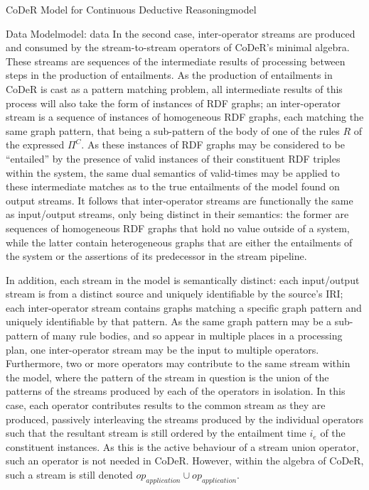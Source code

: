 \begin{nestedsection}{CoDeR Model for Continuous Deductive Reasoning}{model}
\begin{nestedsection}{Data Model}{model: data}
		In the second case, inter-operator streams are produced and consumed by the stream-to-stream operators of CoDeR's minimal algebra.
		These streams are sequences of the intermediate results of processing between steps in the production of entailments.
		As the production of entailments in CoDeR is cast as a pattern matching problem, all intermediate results of this process will also take the form of instances of RDF graphs;
		an inter-operator stream is a sequence of instances of homogeneous RDF graphs, each matching the same graph pattern, that being a sub-pattern of the body of one of the rules $R$ of the expressed $\Pi^C$.
		As these instances of RDF graphs may be considered to be ``entailed'' by the presence of valid instances of their constituent RDF triples within the system, the same dual semantics of valid-times may be applied to these intermediate matches as to the true entailments of the model found on output streams.
		It follows that inter-operator streams are functionally the same as input/output streams, only being distinct in their semantics:
		the former are sequences of homogeneous RDF graphs that hold no value outside of a system, while the latter contain heterogeneous graphs that are either the entailments of the system or the assertions of its predecessor in the stream pipeline.

		In addition, each stream in the model is semantically distinct:
		each input/output stream is from a distinct source and uniquely identifiable by the source's IRI;
		each inter-operator stream contains graphs matching a specific graph pattern and uniquely identifiable by that pattern.
		As the same graph pattern may be a sub-pattern of many rule bodies, and so appear in multiple places in a processing plan, one inter-operator stream may be the input to multiple operators.
		Furthermore, two or more operators may contribute to the same stream within the model, where the pattern of the stream in question is the union of the patterns of the streams produced by each of the operators in isolation.
		In this case, each operator contributes results to the common stream as they are produced, passively interleaving the streams produced by the individual operators such that the resultant stream is still ordered by the entailment time $i_e$ of the constituent instances.
		As this is the active behaviour of a stream union operator, such an operator is not needed in CoDeR.
		However, within the algebra of CoDeR, such a stream is still denoted ${op_{application} \cup op_{application}}$.
	\end{nestedsection}


\end{nestedsection}
